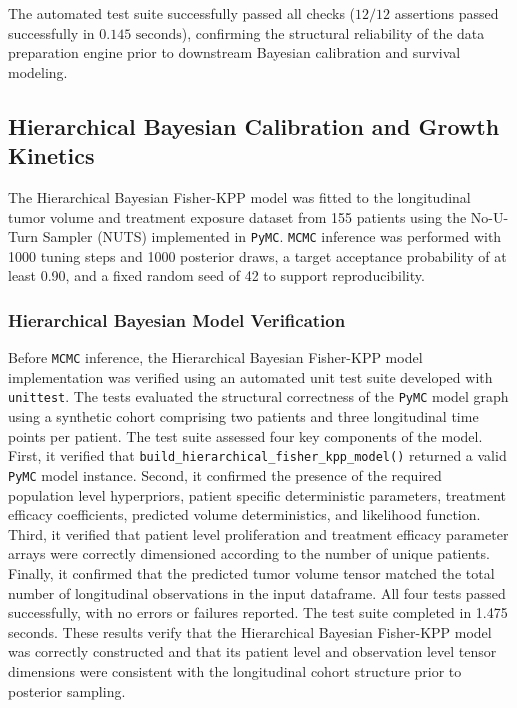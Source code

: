 The automated test suite successfully passed all checks ($12/12$ assertions passed successfully in $0.145\text{ seconds}$), confirming the structural reliability of the data preparation engine prior to downstream Bayesian calibration and survival modeling.

\subsection{Hierarchical Bayesian Calibration and Growth Kinetics}

The Hierarchical Bayesian Fisher-KPP model was fitted to the longitudinal tumor volume and treatment exposure dataset from 155 patients using the No-U-Turn Sampler (NUTS) implemented in \texttt{PyMC}. \texttt{MCMC} inference was performed with 1000 tuning steps and 1000 posterior draws, a target acceptance probability of at least 0.90, and a fixed random seed of 42 to support reproducibility.

\subsubsection{Hierarchical Bayesian Model Verification}

Before \texttt{MCMC} inference, the Hierarchical Bayesian Fisher-KPP model implementation was verified using an automated unit test suite developed with \texttt{unittest}. The tests evaluated the structural correctness of the \texttt{PyMC} model graph using a synthetic cohort comprising two patients and three longitudinal time points per patient. The test suite assessed four key components of the model. First, it verified that \texttt{build\_hierarchical\_fisher\_kpp\_model()} returned a valid \texttt{PyMC} model instance. Second, it confirmed the presence of the required population level hyperpriors, patient specific deterministic parameters, treatment efficacy coefficients, predicted volume deterministics, and likelihood function. Third, it verified that patient level proliferation and treatment efficacy parameter arrays were correctly dimensioned according to the number of unique patients. Finally, it confirmed that the predicted tumor volume tensor matched the total number of longitudinal observations in the input dataframe. All four tests passed successfully, with no errors or failures reported. The test suite completed in 1.475 seconds. These results verify that the Hierarchical Bayesian Fisher-KPP model was correctly constructed and that its patient level and observation level tensor dimensions were consistent with the longitudinal cohort structure prior to posterior sampling.


